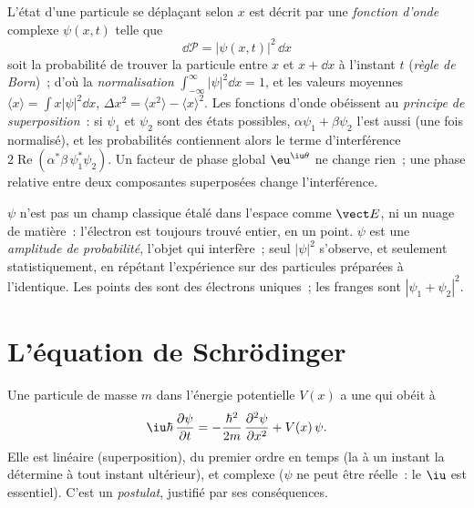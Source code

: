\begin{definition}\label{def:b2:schrodinger-wave-functions:psi}
L'état d'une particule se déplaçant selon $x$ est décrit par une
\emph{fonction d'onde} complexe $\psi(x,t)$ telle que
\[
\dd\mathcal P = |\psi(x,t)|^2\,\dd x
\]
soit la probabilité de trouver la particule entre $x$ et $x + \dd x$
à l'instant $t$ (\emph{règle de Born})~; d'où la
\emph{normalisation} $\int_{-\infty}^{\infty}|\psi|^2\dd x = 1$, et les
valeurs moyennes $\langle x\rangle = \int x|\psi|^2\dd x$, $\Delta x^2 =
\langle x^2\rangle - \langle x\rangle^2$. Les fonctions d'onde obéissent au
\emph{principe de superposition}~: si
$\psi_1$ et $\psi_2$ sont des états possibles, $\alpha\psi_1 +
\beta\psi_2$ l'est aussi (une fois normalisé), et les probabilités contiennent alors le
terme d'interférence $2\operatorname{Re}(\alpha^*\beta\,\psi_1^*\psi_2)$. Un
facteur de phase global $\eu^{\iu\theta}$ ne change rien~; une phase relative
entre deux composantes superposées change l'interférence.
\end{definition}

\begin{remark}\label{rem:b2:schrodinger-wave-functions:not}
$\psi$ n'est pas un champ classique étalé dans l'espace comme $\vect E$, ni un
nuage de matière~: l'électron est toujours trouvé entier, en un point.
$\psi$ est une \emph{amplitude de probabilité}, l'objet qui
interfère~; seul $|\psi|^2$ s'observe, et seulement statistiquement, en
répétant l'expérience sur des particules préparées à l'identique. Les points
des  sont des électrons uniques~; les franges sont $|\psi_1 +
\psi_2|^2$.
\end{remark}

\section{L'équation de Schrödinger}

\begin{theorem}\label{thm:b2:schrodinger-wave-functions:equation}
Une particule de masse $m$ dans l'énergie potentielle $V(x)$ a une  qui obéit à
\[
\iu\hbar\,\frac{\partial\psi}{\partial t} = -\frac{\hbar^2}{2m}\,\frac{\partial^2\psi}{\partial x^2} + V(x)\,\psi .
\]
Elle est linéaire (superposition), du premier ordre en temps (la 
à un instant la détermine à tout instant ultérieur), et complexe ($\psi$
ne peut être réelle~: le $\iu$ est essentiel). C'est un \emph{postulat},
justifié par ses conséquences.
\end{theorem}

